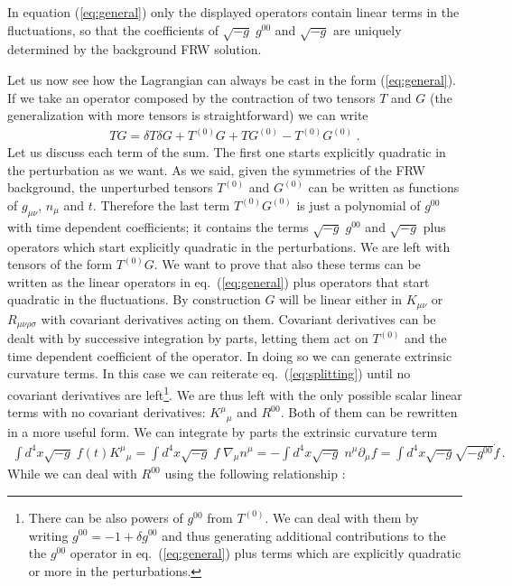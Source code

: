 \documentclass[12pt,letterpaper]{article}
\def\be{\begin{eqnarray}}
\def\ee{\end{eqnarray}}
\begin{document}
{In equation (\ref{eq:general}) only the displayed operators contain linear terms in the fluctuations, so that the coefficients of  $\sqrt{-g}\;g^{00}$ and $\sqrt{-g}$ are uniquely determined by the background FRW solution.

Let us now see how the Lagrangian can always be cast in the form (\ref{eq:general}). If we take an operator composed by the contraction of two tensors $T$ and $G$ (the generalization with more tensors is straightforward) we can write
\be
TG = \delta T \delta G + T^{(0)} G + T G^{(0)} - T^{(0)} G^{(0)} \;. \label{eq:splitting}
\ee
 Let us discuss each term of the sum. The first one starts explicitly quadratic in the perturbation as we want. As we said, given the symmetries of the FRW background, the unperturbed tensors $T^{(0)}$ and $G^{(0)}$ can be written as functions of $g_{\mu\nu}$, $n_\mu$ and $t$. Therefore the last term $T^{(0)} G^{(0)}$ is just a polynomial of $g^{00}$ with time dependent coefficients; it contains the terms $\sqrt{-g}\;g^{00}$ and $\sqrt{-g}$ plus operators which start explicitly quadratic in the perturbations.
We are left with tensors of the form $T^{(0)} G$. We want to prove that also these terms can be written as the linear operators in eq.~(\ref{eq:general}) plus operators that start quadratic in the fluctuations. By construction $G$ will be linear either in $K_{\mu\nu}$ or $R_{\mu\nu\rho\sigma}$ with covariant derivatives acting on them.  Covariant derivatives can be dealt with by successive integration by parts, letting them act on $T^{(0)}$ and the time dependent coefficient of the operator. In doing so we can generate extrinsic curvature terms. In this case we can reiterate eq.~(\ref{eq:splitting}) until no covariant derivatives are left\footnote{There can be also powers of $g^{00}$ from $T^{(0)}$. We can deal with them by writing $g^{00} = -1 +\delta g^{00}$ and thus generating additional contributions to the the $g^{00}$ operator in eq.~(\ref{eq:general}) plus terms which are explicitly quadratic or more in the perturbations.}.  We are thus left with the only possible scalar linear terms with no covariant derivatives:  $K^{\mu}  {}_{\mu}$ and $R^{00}$. Both of them can be rewritten in a more useful form. We can integrate by parts the extrinsic curvature term
\begin{eqnarray}
\int d^4x \sqrt{-g}\; f(t) K^{\mu} {}_{\mu} =\int d^4x \sqrt{-g}\; f\; \nabla_{\mu} n^{\mu}=-\int d^4 x \sqrt{-g} \;n^\mu \partial_\mu f =\int d^4x \sqrt{-g} \sqrt{-g^{00}} \dot f \,. 
\end{eqnarray}
While we can deal with $R^{00}$ using the following relationship \cite{Wald:1984rg}:
}
\end{document}
